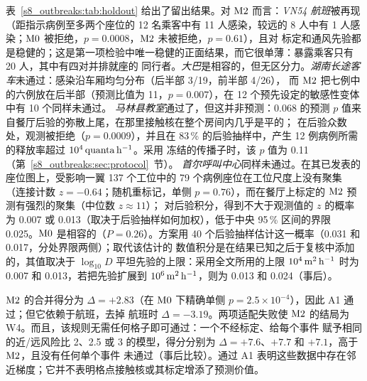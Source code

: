 表~\ref{s8_outbreaks:tab:holdout} 给出了留出结果。对 $\mathrm{M2}$ 而言：\emph{VN54 航班}被再现（距指示病例至多两个座位的
12 名乘客中有 11 人感染，较远的 8 人中有 1 人感染；$\mathrm{M0}$ 被拒绝，$p=0.0008$，$\mathrm{M2}$ 未被拒绝，$p=0.61$），且对
标定和通风先验都是稳健的；这是第一项检验中唯一稳健的正面结果，而它很单薄：暴露乘客只有 20 人，其中有四对并排就座的
同行者。\emph{大巴}是相容的，但无区分力。\emph{湖南长途客车}未通过：感染沿车厢均匀分布（后半部 3/19，前半部 4/26），
而 $\mathrm{M2}$ 把七例中的六例放在后半部（预测比值为 11，$p=0.007$），在 12 个预先设定的敏感性变体中有 10 个同样未通过。
\emph{马林县教室}通过了，但这并非预测：0.068 的预测 $p$ 值来自餐厅后验的弥散上尾，在那里接触核在整个房间内几乎是平的；
在后验众数处，观测被拒绝（$p=0.0009$），并且在 83\,\% 的后验抽样中，产生 12 例病例所需的释放率超过 $10^{4}\,\mathrm{quanta}\,\mathrm{h}^{-1}$。采用
冻结的传播子时，该 $p$ 值为 0.11（第~\ref{s8_outbreaks:sec:protocol}~节）。
\emph{首尔呼叫中心}同样未通过。在其已发表的座位图上，受影响一翼 137 个工位中的 79 个病例座位在工位尺度上没有聚集
（连接计数 $z=-0.64$；随机重标记，单侧 $p=0.76$），而在餐厅上标定的 $\mathrm{M2}$ 预测有强烈的聚集（中位数 $z\approx11$）；
对后验积分，得到不大于观测值的 $z$ 的概率为 0.007 或 0.013（取决于后验抽样如何加权），低于中央 95\,\% 区间的界限
0.025。$\mathrm{M0}$ 是相容的（$P=0.26$）。方案用 40 个后验抽样估计这一概率（0.031 和 0.017，分处界限两侧）；取代该估计的
数值积分是在结果已知之后于复核中添加的，其值取决于 $\log_{10}D$ 平坦先验的上限：采用全文所用的上限 $10^{4}\,\mathrm{m}^2\,\mathrm{h}^{-1}$ 时为
0.007 和 0.013，若把先验扩展到 $10^{6}\,\mathrm{m}^2\,\mathrm{h}^{-1}$，则为 0.013 和 0.024（事后）。

$\mathrm{M2}$ 的合并得分为 $\Delta=+2.83$（在 $\mathrm{M0}$ 下精确单侧 $p=2.5\times10^{-4}$），因此 A1 通过；但它依赖于航班，去掉
航班时 $\Delta=-3.19$。两项适配失败使 $\mathrm{M2}$ 的结局为 W4。而且，该规则无需任何格子即可通过：一个不经标定、给每个事件
赋予相同的近/远风险比 2、2.5 或 3 的模型，得分分别为 $\Delta=+7.6$、$+7.7$ 和 $+7.1$，高于 $\mathrm{M2}$，且没有任何单个事件
未通过（事后比较）。通过 A1 表明这些数据中存在邻近梯度；它并不表明格点接触核或其标定增添了预测价值。

